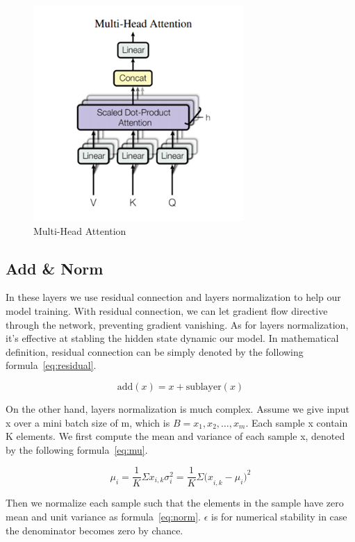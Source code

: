\documentclass{article}
\begin{document}
\begin{figure}
    \centering
    \includegraphics[scale=0.6]{multihead}
    \caption{Multi-Head Attention}
    \label{fig:multihead}
\end{figure}

\subsection{Add \& Norm}

In these layers we use residual connection and layers normalization to
help our model training. With residual connection,
we can let gradient flow directive through the network,
preventing gradient vanishing. As for layers normalization,
it’s effective at stabling the hidden state dynamic our model.
In mathematical definition, residual connection can be simply denoted
by the following formula~\ref{eq:residual}.

\begin{equation}
    \label{eq:residual}
    \textrm{add}(x)=x+\textrm{sublayer}(x)
\end{equation}

On the other hand, layers normalization is much complex.
Assume we give input x over a mini batch size of m,
which is $B={x_1, x_2, \ldots, x_m}$. Each sample x contain K elements.
We first compute the mean and variance of each sample x,
denoted by the following formula~\ref{eq:mu}.

\begin{equation}
    \label{eq:mu}
    \mu_i=
    \frac{1}{K}\Sigma x_{i,k}\sigma_i^2=
    \frac{1}{K}\Sigma{{(x}_{i,k}-\mu_i)}^2
\end{equation}

Then we normalize each sample such that the elements in the sample
have zero mean and unit variance as formula~\ref{eq:norm}.
$\epsilon$ is for numerical stability
in case the denominator becomes zero by chance.
\end{document}
